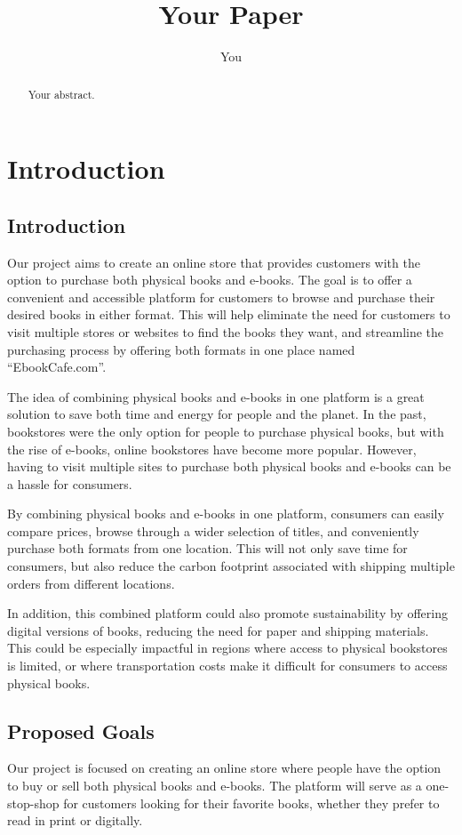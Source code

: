 \documentclass[12pt,a4paper]{article}
\title{Your Paper}
\author{You}
\begin{document}
\maketitle

\begin{abstract}
Your abstract.
\end{abstract}

\tableofcontents
\pagebreak
\section{Introduction}
\subsection{Introduction}
Our project aims to create an online store that provides customers with the option to purchase both physical books and e-books. The goal is to offer a convenient and accessible platform for customers to browse and purchase their desired books in either format. This will help eliminate the need for customers to visit multiple stores or websites to find the books they want, and streamline the purchasing process by offering both formats in one place named “EbookCafe.com”.

The idea of combining physical books and e-books in one platform is a great solution to save both time and energy for people and the planet. In the past, bookstores were the only option for people to purchase physical books, but with the rise of e-books, online bookstores have become more popular. However, having to visit multiple sites to purchase both physical books and e-books can be a hassle for consumers.

By combining physical books and e-books in one platform, consumers can easily compare prices, browse through a wider selection of titles, and conveniently purchase both formats from one location. This will not only save time for consumers, but also reduce the carbon footprint associated with shipping multiple orders from different locations.

In addition, this combined platform could also promote sustainability by offering digital versions of books, reducing the need for paper and shipping materials. This could be especially impactful in regions where access to physical bookstores is limited, or where transportation costs make it difficult for consumers to access physical books.
\subsection{Proposed Goals}
Our project is focused on creating an online store where people have the option to buy or sell both physical books and e-books. The platform will serve as a one-stop-shop for customers looking for their favorite books, whether they prefer to read in print or digitally.
\end{document}

